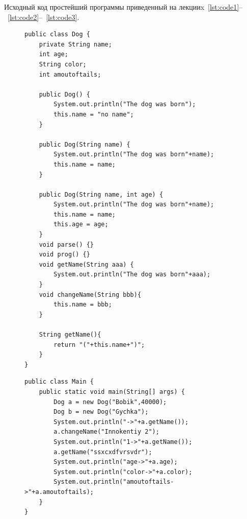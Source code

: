 \documentclass[a4paper, 14pt]{extarticle}
\begin{document}
\newpage

Исходный код простейший программы приведенный на лекцииx~\ref{lst:code1}--~\ref{lst:code2}--~\ref{lst:code3}.

\begin{figure}[!htb]
\begin{lstlisting}[caption={Пример реализации класса}, label={lst:code1}]
public class Dog {
    private String name;
    int age;
    String color;
    int amoutoftails;

    public Dog() {
        System.out.println("The dog was born");
        this.name = "no name"; 
    }

    public Dog(String name) {
        System.out.println("The dog was born"+name);
        this.name = name; 
    }

    public Dog(String name, int age) {
        System.out.println("The dog was born"+name);
        this.name = name; 
        this.age = age; 
    }
    void parse() {}
    void prog() {}
    void getName(String aaa) {
        System.out.println("The dog was born"+aaa);
    }  
    void changeName(String bbb){
        this.name = bbb;
    }

    String getName(){
        return "("+this.name+")";
    }   
}
\end{lstlisting}
\end{figure}

\begin{figure}[!htb]
\begin{lstlisting}[caption={Пример создания экземпляра класса}, label={lst:code2}]
public class Main {
    public static void main(String[] args) {
        Dog a = new Dog("Bobik",40000);
        Dog b = new Dog("Gychka");
        System.out.println("->"+a.getName());
        a.changeName("Innokentiy 2");
        System.out.println("1->"+a.getName());
        a.getName("ssxcxdfvrsvdr");
        System.out.println("age->"+a.age);
        System.out.println("color->"+a.color);
        System.out.println("amoutoftails->"+a.amoutoftails);
    }
}
\end{lstlisting}
\end{figure}

\newpage
\end{document}
